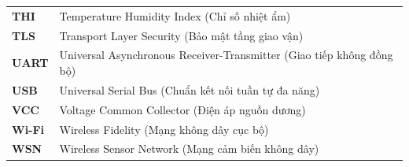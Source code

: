 \begin{longtable}{@{} p{} p{} @{}}
\textbf{THI}    & Temperature Humidity Index (Chỉ số nhiệt ẩm) \\
\textbf{TLS}    & Transport Layer Security (Bảo mật tầng giao vận) \\
\textbf{UART}   & Universal Asynchronous Receiver-Transmitter (Giao tiếp không đồng bộ) \\
\textbf{USB}    & Universal Serial Bus (Chuẩn kết nối tuần tự đa năng) \\
\textbf{VCC}    & Voltage Common Collector (Điện áp nguồn dương) \\
\textbf{Wi-Fi}  & Wireless Fidelity (Mạng không dây cục bộ) \\
\textbf{WSN}    & Wireless Sensor Network (Mạng cảm biến không dây) \\

\end{longtable}
\newpage